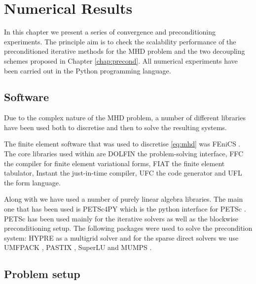 \chapter{Numerical Results}
\label{chap:results}

In this chapter we present a series of convergence and preconditioning experiments. The principle aim is to check the scalability performance of the preconditioned iterative methods for the MHD problem and the two decoupling schemes proposed in Chapter \ref{chap:precond}. All numerical experiments have been carried out in the Python programming language.

\section{Software}

Due to the complex nature of the MHD problem, a number of different libraries have been used both to discretise and then to solve the resulting systems.

The finite element software that was used to discretise \eqref{eq:mhd} was FEniCS \cite{wells2012automated}. The core libraries used within \fenics are DOLFIN \cite{LoggWells2010a,LoggWellsEtAl2012a} the problem-solving interface, FFC \cite{KirbyLogg2006a,LoggOlgaardEtAl2012a,OlgaardWells2010b} the compiler for finite element variational forms, FIAT \cite{Kirby2012a,Kirby2004a} the finite element  tabulator, Instant the just-in-time compiler, UFC \cite{AlnaesLoggEtAl2009a,AlnaesLoggEtAl2012a} the code generator and UFL \cite{AlnaesEtAl2012,Alnaes2012a} the form language.

Along with \fenics we have used a number of purely linear algebra libraries. The main one that has been used is PETSc4PY which is the python interface for PETSc \cite{petsc-web-page,petsc-user-ref}. PETSc has been used mainly for the iterative solvers as well as the blockwise preconditioning setup. The following packages were used to solve the precondition system: HYPRE \cite{falgout2002hypre} as a multigrid solver and for the sparse direct solvers we use UMFPACK \cite{Davis:2004:CPS:992200.992205,Davis:2004:AUV:992200.992206,Davis:1999:CUM:305658.287640,davis1997unsymmetric}, PASTIX \cite{henon2002pastix}, SuperLU \cite{superlu_ug99,li05} and MUMPS \cite{amestoy2000multifrontal,amestoy2001fully,amestoy2006hybrid}.

\section{Problem setup}

